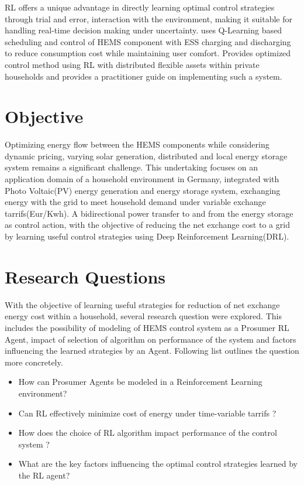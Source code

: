\begin{large}
RL offers a unique advantage in directly learning optimal control strategies through trial and error, interaction with the environment, making it suitable for handling real-time decision making under uncertainty. \cite{qlearning} uses Q-Learning based scheduling and control of HEMS component with ESS charging and discharging to reduce consumption cost while maintaining user comfort. \cite{drlgym} Provides optimized control method using RL with distributed flexible assets within private households and provides a practitioner guide on implementing such a system. \\ 

\section{Objective}

Optimizing energy flow between the HEMS components while considering dynamic pricing, varying solar generation, distributed and local energy storage system remains a significant challenge. This undertaking focuses on an application domain of a household environment in Germany, integrated with Photo Voltaic(PV) energy generation and energy storage system, exchanging energy with the grid to meet household demand under variable exchange tarrifs(Eur/Kwh). A bidirectional power transfer to and from the energy storage as control action, with the objective of reducing the net exchange cost to a grid by learning useful control strategies using Deep Reinforcement Learning(DRL). \\

\section{Research Questions}

With the objective of learning useful strategies for reduction of net exchange energy cost within a household, several research question were explored. This includes the possibility of modeling of HEMS control system as a Prosumer RL Agent, impact of selection of algorithm on performance of the system and factors influencing the learned strategies by an Agent. Following list outlines the question more concretely. 

\begin{itemize}
	\item How can Prosumer Agents be modeled in a  Reinforcement Learning
		environment?
	\item Can RL effectively minimize cost of energy under time-variable tarrifs ?
	\item How does the choice of RL algorithm impact  performance of the control system ?
	\item What are the key factors influencing the optimal control strategies learned by the RL agent?
\end{itemize}


\end{large}
